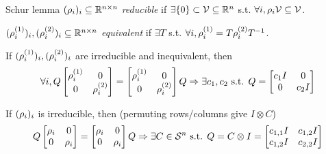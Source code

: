 \begin{frame}{Schur lemma}
  \noindent$(\rho_i)_i\subseteq \mathbb{R}^{n \times n}$ \emph{reducible} if $\exists \{0\} \subset \mathcal{V} \subseteq \mathbb{R}^n$ s.t. $\forall i, \rho_i \mathcal{V} \subseteq \mathcal{V}$.

  \noindent$(\rho^{(1)}_i)_i, (\rho^{(2)}_i)_i \subseteq \mathbb{R}^{n \times n}$ \emph{equivalent} if $\exists T$ s.t. $\forall i, \rho^{(1)}_i = T\rho^{(2)}_iT^{-1}$.

  If $(\rho^{(1)}_i)_i, (\rho^{(2)}_i)_i$ are irreducible and inequivalent, then
  $$
  \forall i,
  Q
  \begin{bmatrix}
    \rho^{(1)}_i & 0\\
    0 & \rho^{(2)}_i
  \end{bmatrix}
    =
  \begin{bmatrix}
    \rho^{(1)}_i & 0\\
    0 & \rho^{(2)}_i
  \end{bmatrix}
  Q
  \Rightarrow
  \exists c_1, c_2 \text{ s.t. }
  Q =
  \begin{bmatrix}
    c_1 I & 0\\
    0 & c_2 I
  \end{bmatrix}
  $$

  If $(\rho_i)_i$ is irreducible, then (permuting rows/columns give
  $I \otimes C$)
  $$
  Q
  \begin{bmatrix}
    \rho_i & 0\\
    0 & \rho_i
  \end{bmatrix}
    =
  \begin{bmatrix}
    \rho_i & 0\\
    0 & \rho_i
  \end{bmatrix}
  Q
  \Rightarrow
  \exists C \in \mathcal{S}^{n} \text{ s.t. }
  Q = C \otimes I =
  \begin{bmatrix}
    c_{1,1}I & c_{1,2}I\\
    c_{1,2}I & c_{2,2}I
  \end{bmatrix}
  $$


\end{frame}
